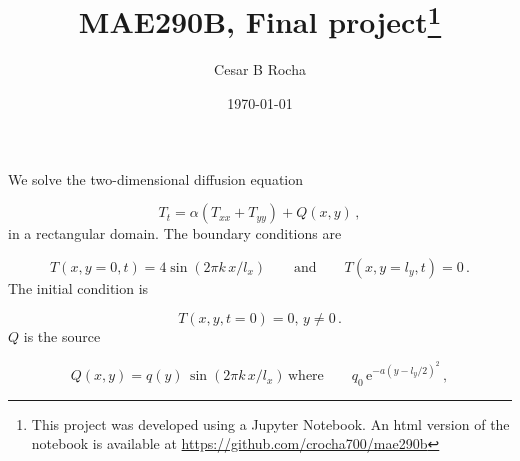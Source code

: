 \documentclass[11pt]{article}
\title{MAE290B, Final project\footnote{This project was developed using a Jupyter Notebook. An html version of the notebook is available at \href{https://github.com/crocha700/mae290b}{https://github.com/crocha700/mae290b}}}
\author{Cesar B Rocha}
\date{\today}
\newcommand{\ee}{\mathrm{e}}
\newcommand{\com}{\, ,}
\newcommand{\per}{\, .}
\def\beq{\begin{equation}}
\def\eeq{\end{equation}}
\begin{document}
\maketitle

We solve the two-dimensional diffusion equation 

\beq
\label{exact_eqn}
T_t = \alpha\left(T_{xx}+T_{yy}\right) + Q(x,y)\com
\eeq
 in a rectangular domain. The boundary conditions are


\beq
\label{bc_eqn}
T(x,y=0,t) = 4\sin\left(2\pi k\,x/l_x\right)\qquad \text{and}\qquad T(x,y=l_y,t) = 0\per
\eeq
The initial condition is

\beq
\label{ic_eqn}
T(x,y,t=0) = 0, \,y\neq0\per
\eeq
$Q$ is the source

\beq
\label{ic_eqn}
Q(x,y) = q(y)\,\sin\left(2\pi k\,x/l_x\right)\, \text{where}\qquad q_0\,\ee^{-a(y-l_y/2)^2}\com
\eeq
\end{document}
